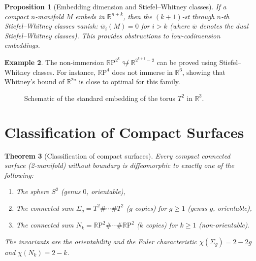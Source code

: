 \documentclass[12pt,a4paper,openany]{book}
\newtheorem{theorem}{Theorem}[section]
\newtheorem{proposition}[theorem]{Proposition}
\theoremstyle{definition}
\newtheorem{example}[theorem]{Example}
\theoremstyle{remark}
\newcommand{\R}{\mathbb{R}}
\newcommand{\RP}{\mathbb{R}\mathrm{P}}
\begin{document}
\begin{proposition}[Embedding dimension and Stiefel--Whitney classes]\label{prop:embed-obstruction}
If a compact $n$-manifold $M$ embeds in $\R^{n+k}$, then the
$(k+1)$-st through $n$-th Stiefel--Whitney classes vanish:
$\overline{w}_i(M) = 0$ for $i > k$ (where $\overline{w}$ denotes the
dual Stiefel--Whitney classes). This provides obstructions to
low-codimension embeddings.
\end{proposition}

\begin{example}\label{ex:rp-embed-obstruction}
The non-immersion $\RP^{2^k}\not\looparrowright\R^{2^{k+1}-2}$ can
be proved using Stiefel--Whitney classes. For instance,
$\RP^4$ does not immerse in $\R^6$, showing that Whitney's bound
of $\R^{2n}$ is close to optimal for this family.
\end{example}

\begin{figure}[ht]
\centering
{}
\caption{Schematic of the standard embedding of the torus $T^2$ in $\R^3$.}\label{fig:torus-r3}
\end{figure}

\section{Classification of Compact Surfaces}\label{sec:surface-classification}

\begin{theorem}[Classification of compact surfaces]\label{thm:surface-classification}
Every compact connected surface (2-manifold) without boundary is
diffeomorphic to exactly one of the following:
\begin{enumerate}[label=(\roman*)]
  \item The sphere $S^2$ (genus $0$, orientable),
  \item The connected sum $\Sigma_g = T^2 \# \cdots \# T^2$ ($g$ copies)
    for $g \ge 1$ (genus $g$, orientable),
  \item The connected sum $N_k = \RP^2 \# \cdots \# \RP^2$ ($k$ copies)
    for $k \ge 1$ (non-orientable).
\end{enumerate}
The invariants are the orientability and the Euler characteristic
$\chi(\Sigma_g) = 2-2g$ and $\chi(N_k) = 2-k$.
\end{theorem}
\end{document}
